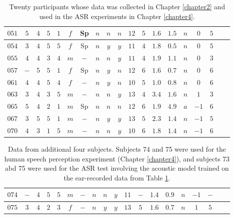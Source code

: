 \begin{table}
\begin{tabular}{|c||c|c|c|c|c|c|c|c|c|c|c|c|c|c|c|c|c|c|}
\textbf{$051$} & $5$ & $4$ & $5$ & $1$ & $f$ & Sp & $n$ & $n$ & $n$ & $12$ & $5$ & $1.6$ & $1.5$ & $n$ & $0$ & $5$ \\ \hline
\textbf{$054$} & $3$ & $4$ & $5$ & $5$ & $f$ & Sp & $n$ & $y$ & $y$ & $11$ & $4$ & $1.8$ & $0.5$ & $n$ & $0$ & $5$ \\ \hline
\textbf{$055$} & $4$ & $4$ & $3$ & $4$ & $m$ & $-$ & $n$ & $n$ & $y$ & $11$ & $4$ & $1.9$ & $1.1$ & $n$ & $0$ & $3$  \\ \hline
\textbf{$057$} & $-$ & $5$ & $5$ & $1$ & $f$ & Sp & $n$ & $y$ & $n$ & $12$ & $6$ & $1.6$ & $0.7$ & $n$ & $0$ & $6$ \\ \hline
\textbf{$061$} & $4$ & $4$ & $5$ & $4$ & $f$ & $-$ & $n$ & $y$ & $n$ & $10$ & $5$ & $1.0$ & $0.8$ & $n$ & $0$ & $6$ \\ \hline
\textbf{$063$} & $3$ & $4$ & $3$ & $5$ & $m$ & $-$ & $n$ & $n$ & $y$ & $13$ & $4$ & $3.4$ & $1.6$ & $n$ & $1$ & $3$  \\ \hline
\textbf{$065$} & $5$ & $4$ & $2$ & $1$ & $m$ & Sp & $n$ & $n$ & $n$ & $12$ & $6$ & $1.9$ & $4.9$ & $a$ & $-1$ & $6$  \\ \hline
\textbf{$067$} & $3$ & $5$ & $5$ & $1$ & $m$ & $-$ & $n$ & $y$ & $y$ & $13$ & $5$ & $2.3$ & $1.4$ & $n$ & $-1$ & $5$ \\ \hline
\textbf{$070$} & $4$ & $3$ & $1$ & $5$ & $m$ & $-$ & $n$ & $n$ & $y$ & $10$ & $6$ & $1.8$ & $1.4$ & $n$ & $-1$ & $6$ \\ \hline
\end{tabular}
\caption{Twenty participants whose data was collected in Chapter \ref{chapter2} and used in the ASR experiments in Chapter \ref{chapter4}.}\label{tab:expt1-data}
\end{table}

\begin{table}
\centering
\begin{tabular}{|c||c|c|c|c|c|c|c|c|c|c|c|c|c|c|c|c|c|c|}\hline
\textbf{$074$} & $-$ & $4$ & $5$ & $5$ & $m$ & $-$ & $n$ & $n$ & $y$ & $11$ & $-$ & $1.4$ & $0.9$ & $n$ & $-1$ & $-$  \\ \hline
\textbf{$075$} & $3$ & $4$ & $2$ & $3$ & $f$ & $-$ & $n$ & $y$ & $y$ & $13$ & $5$ & $1.6$ & $0.7$ & $n$ & $1$ & $5$ \\ \hline
\end{tabular}
\caption{Data from additional four subjects.  Subjects 74 and 75 were used for the human speech perception experiment (Chapter \ref{chapter4}), and subjects 73 abd 75 were used for the ASR test involving the acoustic model trained on the ear-recorded data from Table \ref{tab:expt1-data}.}\label{tab:expt2-stims}
\end{table}

